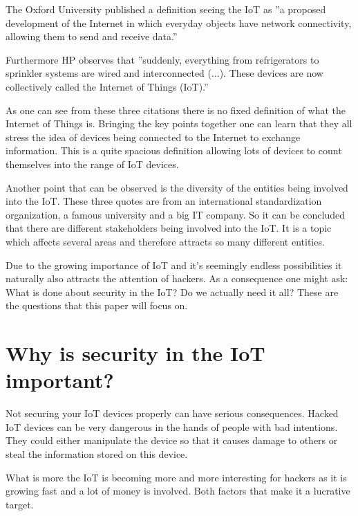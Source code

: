 \documentclass[conference]{IEEEtran}
\begin{document}
The Oxford University published a definition seeing the IoT as ''a 
proposed development of the Internet in which everyday objects have network 
connectivity, allowing them to send and receive data.'' \cite{HPstudy}

Furthermore HP observes that ''suddenly, everything from refrigerators to 
sprinkler systems are wired and interconnected (...). These devices are now 
collectively called the Internet of Things (IoT).'' \cite{HPstudy}

As one can see from these three citations there is no fixed definition of what 
the Internet of Things is. Bringing the key points together one can learn that 
they all stress the idea of devices being connected to the Internet to exchange 
information. This is a quite spacious definition allowing lots of devices to 
count themselves into the range of IoT devices.

Another point that can be observed is the diversity of the entities being 
involved into the IoT. These three quotes are from an international 
standardization organization, a famous university and a big IT company. So it 
can be concluded that there are different stakeholders being involved into the 
IoT. It is a topic which affects several areas and therefore attracts so many 
different entities.

Due to the growing importance of IoT and it's seemingly endless possibilities 
it naturally also attracts the attention of hackers. As a consequence one might 
ask: What is done about security in the IoT? Do we actually need it all? These 
are the questions that this paper will focus on.


\section{Why is security in the IoT important?}
Not securing your IoT devices properly can have serious consequences. Hacked 
IoT devices can be very dangerous in the hands of people with bad intentions. 
They could either manipulate the device so that it causes damage to others or 
steal the information stored on this device. 

What is more the IoT is becoming more and more interesting for hackers as it is 
growing fast and a lot of money is involved. Both factors that make it a 
lucrative target. 
\end{document}
